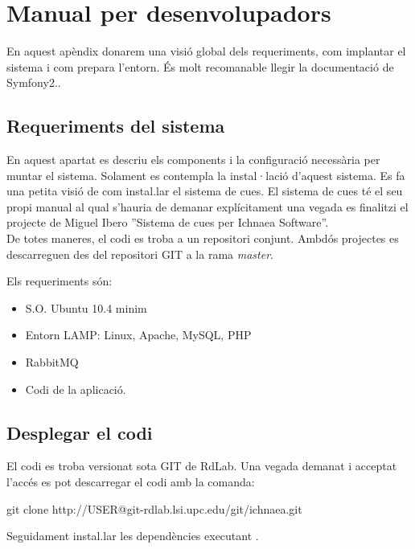 \chapter{Manual per desenvolupadors}
\label{cha:sysguide}

En aquest apèndix donarem una visió global dels requeriments, com implantar el sistema i com prepara l'entorn. \'{E}s molt recomanable llegir la documentació de Symfony2.\cite{symfony}.

\section{Requeriments del sistema}
En aquest apartat es descriu els components i la configuració necessària per muntar el sistema. Solament es contempla la instal·lació d'aquest sistema. Es fa una petita visió de com instal.lar el sistema de cues. El sistema de cues t\'{e} el seu propi manual al qual s'hauria de demanar explícitament una vegada es finalitzi el projecte de Miguel Ibero ''Sistema de cues per Ichnaea Software''.\\

De totes maneres, el codi es troba a un repositori conjunt. Ambdós projectes es descarreguen des del repositori GIT a la rama \textit{master}.

Els requeriments s\'{o}n:
\begin{itemize}
\item S.O. Ubuntu 10.4 minim
\item Entorn LAMP: Linux, Apache, MySQL, PHP
\item RabbitMQ
\item Codi de la aplicació.
\end{itemize}

\section{Desplegar el codi}
\label{sec:deploy}
El codi es troba versionat sota GIT de RdLab. Una vegada demanat i acceptat l'acc\'{e}s es pot descarregar el codi amb la comanda:
\begin{center}
git clone http://USER@git-rdlab.lsi.upc.edu/git/ichnaea.git
\end{center}
Seguidament instal.lar les dependències executant .

